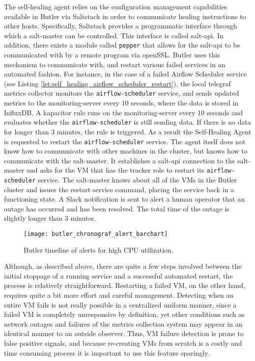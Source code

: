 The self-healing agent relies on the configuration management capabilities available in Butler via Saltstack in order to communicate healing instructions to other hosts. Specifically, Saltstack provides a programmatic interface through which a salt-master can be controlled. This interface is called salt-api. In addition, there exists a module called \texttt{pepper} that allows for the salt-api to be communicated with by a remote program via openSSL. Butler uses this mechanism to communicate with, and restart various failed services in an automated fashion. For instance, in the case of a failed Airflow Scheduler service (see Listing \ref{lst:self_healing_airflow_scheduler_restart}), the local telegraf metrics collector monitors the \texttt{airflow-scheduler} service, and sends updated metrics to the monitoring-server every 10 seconds, where the data is stored in InfluxDB. A kapacitor rule runs on the monitoring-server every 10 seconds and evaluates whether the \texttt{airflow-scheduler} is still sending data. If there is no data for longer than 3 minutes, the rule is triggered. As a result the Self-Healing Agent is requested to restart the \texttt{airflow-scheduler} service. The agent itself does not know how to communicate with other machines in the cluster, but knows how to communicate with the salt-master. It establishes a salt-api connection to the salt-master and asks for the VM that has the tracker role to restart its \texttt{airflow-scheduler} service. The salt-master knows about all of the VMs in the Butler cluster and issues the restart service command, placing the service back in a functioning state. A Slack notification is sent to alert a human operator that an outage has occurred and has been resolved. The total time of the outage is slightly longer than 3 minutes.

\begin{figure}[h]
    \texttt{[image: butler\_chronograf\_alert\_barchart]}
    \centering
    \caption {Butler timeline of alerts for high CPU utilization.}
    \label{fig:butler_chronograf_alert_barchart}
\end{figure} 

Although, as described above, there are quite a few steps involved between the initial stoppage of a running service and a successful automated restart, the process is relatively straightforward. Restarting a failed VM, on the other hand, requires quite a bit more effort and careful management. Detecting when an entire VM fails is not really possible in a centralized uniform manner, since a failed VM is completely unresponsive by definition, yet other conditions such as network outages and failures of the metrics collection system may appear in an identical manner to an outside observer. Thus, VM failure detection is prone to false positive signals, and because re-creating VMs from scratch is a costly and time consuming process it is important to use this feature sparingly.

